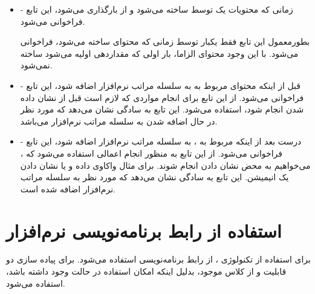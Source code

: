 \documentclass[oneside]{report}
\begin{document}
\begin{itemize}
	\item[ ]
	{\normalsize {}}-
	زمانی که محتویات یک 
	{\normalsize {}} 
	توسط 
	{\normalsize {}} 
	ساخته می‌شود و از 
	{\normalsize {}} 
	بارگذاری می‌شود، این تابع فراخوانی می‌شود. 
	
	بطورمعمول این تابع فقط یکبار توسط 
	{\normalsize {}} 
	زمانی که محتوای 
	{\normalsize {}} 
	ساخته می‌شود، فراخوانی می‌شود. با این وجود محتوای 
	{\normalsize {}}
	الزاما، بار اولی که 
	{\normalsize {}}
	مقداردهی اولیه می‌شود ساخته نمی‌شود. 
	
	\item[ ]
	{\normalsize {}}- 
	قبل از اینکه محتوای 
	{\normalsize {}}
	مربوط به 
	{\normalsize {}}
	به سلسله مراتب 
	{\normalsize {}}
	نرم‌افزار اضافه شود، این تابع فراخوانی می‌شود. از این تابع برای انجام مواردی که لازم است قبل از نشان داده شدن 
	{\normalsize {}}
	انجام شود، استفاده می‌شود. این تابع به سادگی نشان می‌دهد که 
	{\normalsize {}}
	مورد نظر در حال اضافه شدن به سلسله مراتب 
	{\normalsize {}}
	نرم‌افزار می‌باشد.
	
	\item[ ] 
	{\normalsize {}}- 
	درست بعد از اینکه 
	{\normalsize {}}
	مربوط به 
	{\normalsize {}}،
	به سلسله مراتب 
	{\normalsize {}}
	نرم‌افزار اضافه شود، این تابع فراخوانی می‌شود. از این تابع به منظور انجام اعمالی استفاده می‌شود که ، می‌خواهیم به محض نشان دادن 
	{\normalsize {}}
	انجام شوند. برای مثال واکاوی داده و یا نشان دادن یک انیمیشن. این تابع به سادگی نشان می‌دهد که 
	{\normalsize {}}
	مورد نظر به سلسله مراتب 
	{\normalsize {}}
	نرم‌افزار اضافه شده است.
	
\end{itemize}
	
\section{استفاده از رابط برنامه‌نویسی نرم‌افزار {\normalsize {}}}
	برای استفاده از تکنولوژی 
	{\normalsize {}}
	، از رابط برنامه‌نویسی 
	{\normalsize {}}
	استفاده می‌شود. برای پیاده سازی دو قابلیت 
		{\normalsize {}}
		و 
			{\normalsize {}}
			از کلاس 
				{\normalsize {}} 
				موجود، بدلیل اینکه امکان استفاده در حالت 
					{\normalsize {}}
				وجود داشته باشد، استفاده می‌شود.
\end{document}
